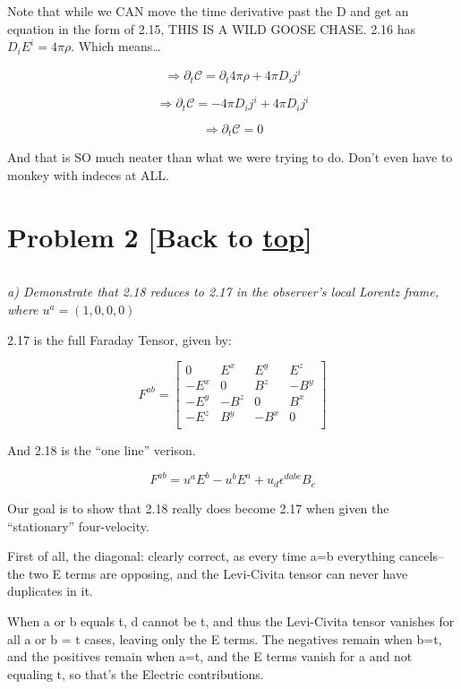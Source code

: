 \documentclass[landscape,letterpaper,10pt,english]{article}
\begin{document}
    Note that while we CAN move the time derivative past the D and get an
equation in the form of 2.15, THIS IS A WILD GOOSE CHASE. 2.16 has
\(D_i E^i = 4\pi \rho\). Which means\ldots{}

\[ \Rightarrow \partial_t \mathcal C = \partial_t 4\pi \rho + 4\pi D_i j^i \]

\[ \Rightarrow \partial_t \mathcal C = - 4\pi D_i j^i + 4\pi D_i j^i \]

\[ \Rightarrow \partial_t \mathcal C = 0 \]

And that is SO much neater than what we were trying to do. Don't even
have to monkey with indeces at ALL.

    \hypertarget{problem-2-back-to-top}{%
\section{\texorpdfstring{Problem 2 {[}Back to
\hyperref[toc]{top}{]}}{Problem 2 {[}Back to {]}}}\label{problem-2-back-to-top}}

\[\label{P2}\]

\emph{a) Demonstrate that 2.18 reduces to 2.17 in the observer's local
Lorentz frame, where \(u^a = (1,0,0,0)\)}

    2.17 is the full Faraday Tensor, given by:

\[ F^{ab} = \begin{bmatrix}
0 & E^x & E^y & E^z \\
-E^x & 0 & B^z & -B^y \\
-E^y & -B^z & 0 & B^x \\
-E^z & B^y & -B^x & 0 \\
\end{bmatrix}
\]

And 2.18 is the ``one line'' verison.

\[ F^{ab} = u^aE^b - u^bE^a + u_d\epsilon^{dabc} B_c \]

Our goal is to show that 2.18 really does become 2.17 when given the
``stationary'' four-velocity.

    First of all, the diagonal: clearly correct, as every time a=b
everything cancels--the two E terms are opposing, and the Levi-Civita
tensor can never have duplicates in it.

When a or b equals t, d cannot be t, and thus the Levi-Civita tensor
vanishes for all a or b = t cases, leaving only the E terms. The
negatives remain when b=t, and the positives remain when a=t, and the E
terms vanish for a and not equaling t, so that's the Electric
contributions.
\end{document}
